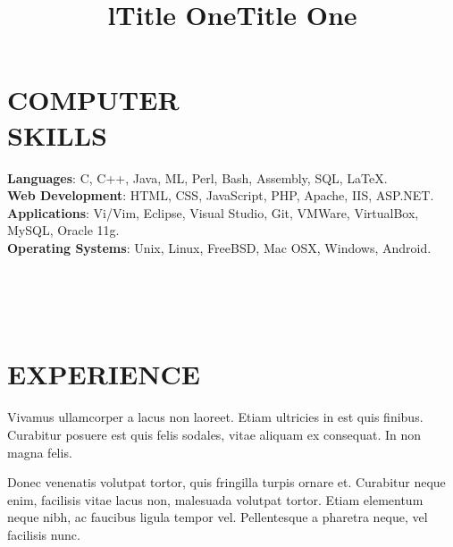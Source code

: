 \documentclass[margin]{res}
\begin{document}
\begin{resume}
\section{COMPUTER\\SKILLS}

\textbf{Languages}: C, C++, Java, ML, Perl, Bash, Assembly, SQL, \LaTeX.
\\
\textbf{Web Development}: HTML, CSS, JavaScript, PHP, Apache, IIS, ASP.NET.
\\
\textbf{Applications}: Vi/Vim, Eclipse, Visual Studio, Git, VMWare, VirtualBox, 
MySQL, Oracle 11g.
\\
\textbf{Operating Systems}: 
Unix, Linux, FreeBSD, Mac OSX, Windows, Android.

\begin{format}
\title{l}\\
\\
\body\\
\end{format}

\section{EXPERIENCE}
\title{\textbf{Title One}}
\begin{position}
Vivamus ullamcorper a lacus non laoreet. Etiam ultricies in est quis finibus. 
Curabitur posuere est quis felis sodales, vitae aliquam ex consequat. In non 
magna felis.
\end{position}

\title{\textbf{Title One}}
\begin{position}
Donec venenatis volutpat tortor, quis fringilla turpis ornare et. Curabitur 
neque enim, facilisis vitae lacus non, malesuada volutpat tortor. Etiam 
elementum neque nibh, ac faucibus ligula tempor vel. Pellentesque a pharetra 
neque, vel facilisis nunc.
\end{position}


\end{resume}
\end{document}
